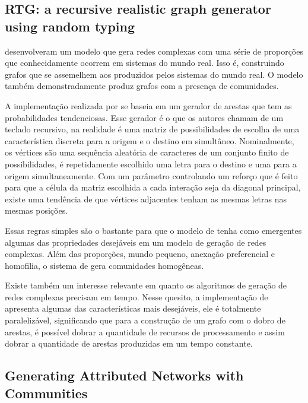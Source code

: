 \documentclass[notes.tex]{subfiles}
\begin{document}
\subsection{RTG: a recursive realistic graph generator using random typing}

 desenvolveram um modelo que gera redes complexas com uma série de proporções que conhecidamente ocorrem em sistemas do mundo real.
Isso é, construindo grafos que se assemelhem aos produzidos pelos sistemas do mundo real.
O modelo também demonstradamente produz grafos com a presença de comunidades.

A implementação realizada por  se baseia em um gerador de arestas que tem as probabilidades tendenciosas.
Esse gerador é o que os autores chamam de um teclado recursivo, na realidade é uma matriz de possibilidades de escolha de uma característica discreta para a origem e o destino em simultâneo.
Nominalmente, os vértices são uma sequência aleatória de caracteres de um conjunto finito de possibilidades, é repetidamente escolhido uma letra para o destino e uma para a origem simultaneamente.
Com um parâmetro controlando um reforço que é feito para que a célula da matriz escolhida a cada interação seja da diagonal principal, existe uma tendência de que vértices adjacentes tenham as mesmas letras nas mesmas posições.

Essas regras simples são o bastante para que o modelo de  tenha como emergentes algumas das propriedades desejáveis em um modelo de geração de redes complexas.
Além das proporções, mundo pequeno, anexação preferencial e homofilia, o sistema de  gera comunidades homogêneas.

Existe também um interesse relevante em quanto os algoritmos de geração de redes complexas precisam em tempo.
Nesse quesito, a implementação de  apresenta algumas das características mais desejáveis, ele é totalmente paralelizável, significando que para a construção de um grafo com o dobro de arestas, é possível dobrar a quantidade de recursos de processamento e assim dobrar a quantidade de arestas produzidas em um tempo constante.

\subsection{Generating Attributed Networks with Communities}
\end{document}
